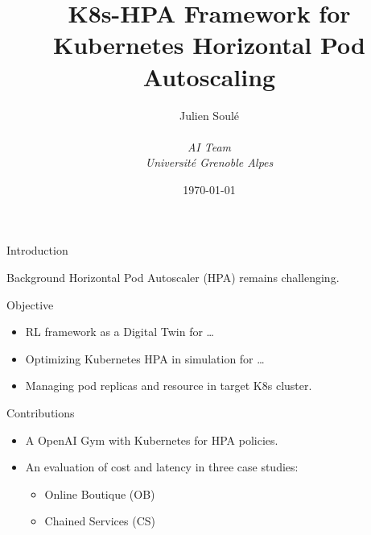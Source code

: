 \documentclass{beamer}
\title{K8s-HPA Framework for Kubernetes Horizontal Pod Autoscaling}
\author{Julien Soulé \\ \ \\ \textit{AI Team} \\ \textit{Université Grenoble Alpes}}
\date{\today}
\begin{document}
\begin{frame}
    \titlepage
\end{frame}

\begin{frame}{Introduction}
    \begin{block}{Background}
        Horizontal Pod Autoscaler (HPA) remains challenging.
    \end{block}
    \begin{block}{Objective}
        \begin{itemize}
            \item  RL framework as a Digital Twin for \dots
            \item  Optimizing Kubernetes HPA in simulation for \dots
            \item  Managing pod replicas and resource in target K8s cluster.
        \end{itemize}

    \end{block}
    \begin{block}{Contributions}
        \begin{itemize}
            \item A OpenAI Gym with Kubernetes for HPA policies.
            \item An evaluation of cost and latency in three case studies:
            \begin{itemize}
                \item Online Boutique (OB)
                \item Chained Services (CS)
            \end{itemize}
        \end{itemize}
    \end{block}
\end{frame}
\end{document}
